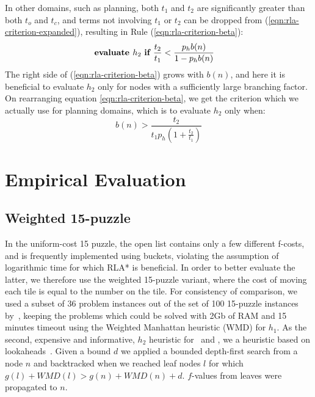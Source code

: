 In other domains, such as planning, both $t_1$ and $t_2$ are
significantly greater than both $t_o$ and $t_c$, and terms
not involving $t_1$ or $t_2$ can be dropped from
(\ref{eqn:rla-criterion-expanded}), resulting in Rule (\ref{eqn:rla-criterion-beta}):
\begin{align}
  &\mbox{\bf evaluate }h_2\mbox{ \bf if } \frac{t_2}{t_1} < \frac {p_hb(n)} {1-p_hb(n)}
\label{eqn:rla-criterion-beta}
\end{align}
The right side of (\ref{eqn:rla-criterion-beta}) grows with $b(n)$, and here it is beneficial to evaluate $h_2$
only for nodes with a sufficiently large branching factor. On rearranging equation \ref{eqn:rla-criterion-beta},
we get the criterion which we actually use for planning domains,
which is to evaluate $h_2$ only when:
\begin{equation}
b(n) > \frac{t_2}{t_1 p_h \left(1 + \frac{t_2}{t_1}\right)}
\label{eqn:rla-planning-rule}
\end{equation}

\section{Empirical Evaluation}
\label{sec:rla-empirical}

\subsection{Weighted 15-puzzle}

In the uniform-cost 15 puzzle, the open list contains only a few
different f-costs, and is frequently implemented using buckets,
violating the assumption of logarithmic time for which RLA* is
beneficial. In order to better evaluate the latter, we therefore use
the weighted 15-puzzle variant, where the cost of moving each tile is
equal to the number on the tile.  For consistency of comparison, we
used a subset of 36 problem instances out of the set of 100 15-puzzle
instances by~\cite{BFID85}, keeping the problems which could be solved
with 2Gb of RAM and 15 minutes timeout using the Weighted Manhattan
heuristic (WMD) for $h_1$. As the second, expensive and informative,
$h_2$ heuristic for \lazyastar~and \rationallazyastar, we a heuristic
based on lookaheads~\cite{DBLP:conf/aaai/SternKFH10}. Given a bound
$d$ we applied a bounded depth-first search from a node $n$ and
backtracked when we reached leaf nodes $l$ for which $g(l)+WMD(l)>
g(n)+WMD(n)+d$. $f$-values from leaves were propagated to $n$.

